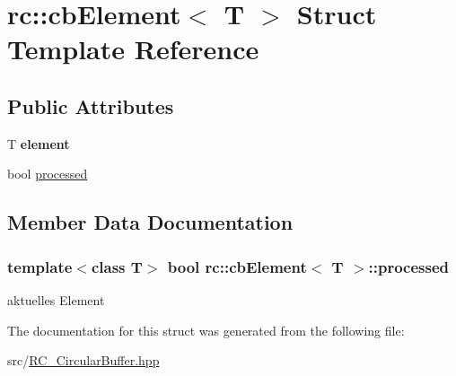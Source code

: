 \hypertarget{structrc_1_1cbElement}{\section{rc\+:\+:cb\+Element$<$ T $>$ Struct Template Reference}
\label{structrc_1_1cbElement}
}
\subsection*{Public Attributes}
\begin{DoxyCompactItemize}
\item 
\hypertarget{structrc_1_1cbElement_a9e0ab0b1cc53698c5aedf11997ffd261}{T {\bfseries element}}\label{structrc_1_1cbElement_a9e0ab0b1cc53698c5aedf11997ffd261}

\item 
bool \hyperlink{structrc_1_1cbElement_a721d493bd93248172628c48c4526f105}{processed}
\end{DoxyCompactItemize}


\subsection{Member Data Documentation}
\hypertarget{structrc_1_1cbElement_a721d493bd93248172628c48c4526f105}{
\subsubsection[{processed}]{\setlength{\rightskip}{0pt plus 5cm}template$<$class T$>$ bool {\bf rc\+::cb\+Element}$<$ T $>$\+::processed}}\label{structrc_1_1cbElement_a721d493bd93248172628c48c4526f105}
aktuelles Element 

The documentation for this struct was generated from the following file\+:\begin{DoxyCompactItemize}
\item 
src/\hyperlink{RC__CircularBuffer_8hpp}{R\+C\+\_\+\+Circular\+Buffer.\+hpp}\end{DoxyCompactItemize}
